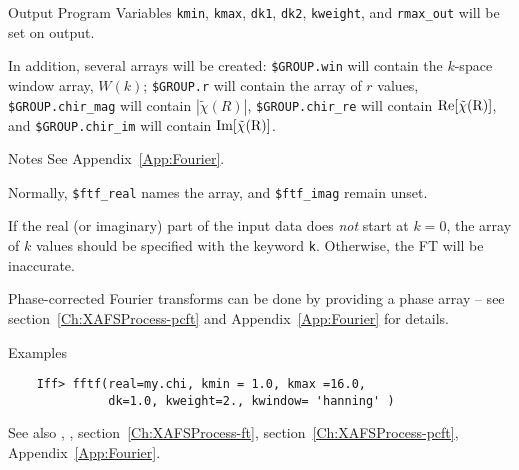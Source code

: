 \begin{IFFcom}
\item[Output Program Variables] {\tt{kmin}}, {\tt{kmax}}, {\tt{dk1}},
  {\tt{dk2}}, {\tt{kweight}}, and {\tt{rmax\_out}} will  be set on output.
 
  In addition, several arrays will be created:
  {\tt{\$GROUP.win}} will contain the $k$-space window array, $W(k)$;
  {\tt{\$GROUP.r}} will contain the array of $r$ values,
  {\tt{\$GROUP.chir\_mag}} will contain $|\tilde\chi(R)|$,
  {\tt{\$GROUP.chir\_re}} will contain $\rm Re[\tilde\chi(R)]$, and
  {\tt{\$GROUP.chir\_im}} will contain $\rm Im[\tilde\chi(R)]$.
  
\item[Notes] See Appendix~{\ref{App:Fourier}}.

  Normally, {\texttt{\$ftf\_real}} names the {\chik} array,
  and {\texttt{\$ftf\_imag}} remain unset. 
  
  If the real (or imaginary) part of the input {\chik} data does
  {\emph{not}} start at $k=0$, the array of $k$ values should be specified
  with the keyword {\tt{k}}.  Otherwise, the FT will be inaccurate.
  
  Phase-corrected Fourier transforms can be done by providing a phase array
  -- see section~\ref{Ch:XAFSProcess-pcft} and
  Appendix~{\ref{App:Fourier}} for details.

\item[Examples] {\hspace{1.in} \vspace{-0.1truein} \relax }
\begin{verbatim} 
    Iff> fftf(real=my.chi, kmin = 1.0, kmax =16.0, 
              dk=1.0, kweight=2., kwindow= 'hanning' )
\end{verbatim}
\item[See also]  {}, {}, 
  section~\ref{Ch:XAFSProcess-ft},
  section~\ref{Ch:XAFSProcess-pcft},
  Appendix~{\ref{App:Fourier}}. 
\end{IFFcom}



